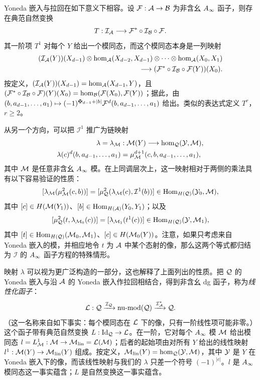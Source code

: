 Yoneda 嵌入与拉回在如下意义下相容。设 $\mathcal F:\mathcal A\to\mathcal B$ 为非含幺 $A_\infty$ 函子，则存在典范自然变换
\begin{equation}\label{eq:1.23}
T:\mathcal I_{\mathcal A}\longrightarrow\mathcal F^*\circ\mathcal I_{\mathcal B}\circ\mathcal F.
\end{equation}
其一阶项 $T^1$ 对每个 $Y$ 给出一个模同态，而这个模同态本身是一列映射
\begin{equation}\label{eq:1.24}
\begin{aligned}
(\mathcal I_{\mathcal A}(Y))(X_{d-1})\otimes\hom_{\mathcal A}(X_{d-2},X_{d-1})\otimes\cdots\otimes\hom_{\mathcal A}(X_0,X_1)\\
\longrightarrow (\mathcal F^*\circ\mathcal I_{\mathcal B}\circ\mathcal F(Y))(X_0).
\end{aligned}
\end{equation}
按定义，$(\mathcal I_{\mathcal A}(Y))(X_{d-1})=\hom_{\mathcal A}(X_{d-1},Y)$，且 $(\mathcal F^*\circ\mathcal I_{\mathcal B}\circ\mathcal F)(Y)(X_0)=\hom_{\mathcal B}(\mathcal F(X_0),\mathcal F(Y))$；据此，由 $(b,a_{d-1},\ldots,a_1)\mapsto(-1)^{\sgnmark_{d-1}+|b|}\F^d(b,a_{d-1},\ldots,a_1)$ 给出。类似的表达式定义 $T^r$，$r\ge2$。

从另一个方向，可以把 $\mathcal I^1$ 推广为链映射
\begin{equation}\label{eq:1.25}
\begin{aligned}
\lambda=\lambda_{\mathcal M}&:\mathcal M(Y)\longrightarrow\hom_{\mathcal Q}(\mathcal Y,\mathcal M),\\
\lambda(c)^d(b,a_{d-1},\ldots,a_1)&=\mu^{d+1}_{\mathcal M}(c,b,a_{d-1},\ldots,a_1),
\end{aligned}
\end{equation}
其中 $\mathcal M$ 是任意非含幺 $A_\infty$ 模。在上同调层次上，这一映射相对于两侧的乘法具有以下容易验证的性质：
\begin{equation}\label{eq:1.26}
[\lambda_{\mathcal M}(\mu^2_{\mathcal M}(c,b))]
=[\mu^2_{\mathcal Q}(\lambda_{\mathcal M}(c),\mathcal I^1(b))]\in\operatorname{Hom}_{H(\mathcal Q)}(\mathcal Y_0,\mathcal M),
\end{equation}
其中 $[c]\in H(\mathcal M(Y_1))$、$[b]\in\operatorname{Hom}_{H(\mathcal A)}(Y_0,Y_1)$；以及
\begin{equation}\label{eq:1.27}
[\mu^2_{\mathcal Q}(t,\lambda_{\mathcal M_0}(c))]
=[\lambda_{\mathcal M_1}(t^1(c))]\in\operatorname{Hom}_{H(\mathcal Q)}(\mathcal Y,\mathcal M_1),
\end{equation}
其中 $[t]\in\operatorname{Hom}_{H(\mathcal Q)}(\mathcal M_0,\mathcal M_1)$、$[c]\in H(\mathcal M_0(Y))$。注意，如果只考虑来自 Yoneda 嵌入的模，并相应地令 $t$ 为 $\mathcal A$ 中某个态射的像，那么这两个等式都归结为 $\mathcal I$ 的 $A_\infty$ 函子方程的特殊情形。

\begin{note}\label{st:1.17}
映射 $\lambda$ 可以视为更广泛构造的一部分，这也解释了上面列出的性质。把 $\mathcal Q$ 的 Yoneda 嵌入与沿 $\mathcal A$ 的 Yoneda 嵌入作拉回相结合，得到非含幺 dg 函子，称为\emph{线性化函子}：
\[
\mathcal L:\mathcal Q\xrightarrow{\mathcal I_{\mathcal Q}}\operatorname{nu\text{-}mod}(\mathcal Q)
\xrightarrow{\mathcal I_{\mathcal A}^*}\mathcal Q.
\]
（这一名称来自如下事实：每个模同态在 $\mathcal L$ 下的像，只有一阶线性项可能非零。）这个函子带有典范自然变换 $L:\operatorname{Id}_{\mathcal Q}\to\mathcal L$。在一阶，它对每个 $A_\infty$ 模 $\mathcal M$ 给出模同态 $l=L^1_{\mathcal M}:\mathcal M\to\mathcal M_{\mathrm{lin}}=\mathcal L(\mathcal M)$；后者的起始项由对所有 $Y$ 给出的线性映射 $l^1:\mathcal M(Y)\to\mathcal M_{\mathrm{lin}}(Y)$ 组成。按定义，$\mathcal M_{\mathrm{lin}}(Y)=\hom_{\mathcal Q}(\mathcal Y,\mathcal M)$，其中 $\mathcal Y$ 是 $Y$ 在 Yoneda 嵌入下的像，而该线性映射与我们的 $\lambda$ 只差一个符号 $(-1)^{|c|}$。$l$ 是 $A_\infty$ 模同态这一事实蕴含；$L$ 是自然变换这一事实蕴含。
\end{note}
